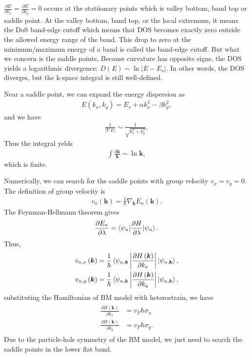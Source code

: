 \documentclass[10pt, oneside]{article}
\newcommand{\p}[1]{\left(#1\right)}
\newcommand{\bv}[1]{\left|#1\right|}
\begin{document}
\(\frac{\partial E}{\partial k_x} = \frac{\partial E}{\partial k_y} = 0\) occurs at the statiionary points which is valley bottom, band top or saddle point. At the valley bottom, band top, or the local extremum, it means the DoS band-edge cutoff which means that DOS becomes exactly zero outside the allowed energy range of the band. This drop to zero at the minimum/maximum energy of a band is called the band-edge cutoff. But what we concern is the saddle points, Because curvature has opposite signs, the DOS  yields a logarithmic divergence: \(D\p{E} \sim \ln \bv{E -E_{s}}\). In other words, the DOS diverges, but the k-space integral is still well-defined.

Near a saddle point, we can expand the energy dispersion as
\begin{align}
	E\p{k_x, k_y} = E_{s} + \alpha k^{2}_{x} - \beta k^{2}_{y},
\end{align}
and we have 
\begin{align}
	\frac{1}{\bv{\nabla E}} \sim \frac{1}{\sqrt{k^{2}_{x} + k^{2}_{y}}},
\end{align}
Thus the integral yelds 
\begin{align}
	\int \frac{d \bm{k}}{\bm{k}} \sim \ln{\bm{k}},
\end{align}
which is finite.

Numerically, we can search for the saddle points with group velocity \(v_x = v_y = 0\). The definition of group velocity is
\begin{align}
	v_{n}\p{\bm{k}} = \frac{1}{\hbar} \nabla_{\bm{k}} E_{n} \p{\bm{k}}.
\end{align}
The Feynman-Hellmann theorem gives
\begin{align}
	\frac{\partial E_{n}}{\partial \lambda} = \braket{\psi_n | \frac{\partial H}{\partial \lambda } | \psi_n}.
\end{align}
Thus, 
\begin{align}
	\begin{split}
		v_{n,x}\p{\bm{k}} & = \frac{1}{\hbar} \braket{\psi_{n, \bm{k}} \bv{\frac{\partial H \p{\bm{k}}}{\partial k_x}} | \psi_{n, \bm{k}}}, \\
		v_{n,y}\p{\bm{k}} & = \frac{1}{\hbar} \braket{\psi_{n, \bm{k}} \bv{\frac{\partial H \p{\bm{k}}}{\partial k_y}} | \psi_{n, \bm{k}}},
	\end{split}
\end{align}
substituting the Hamiltonian of BM model with heterostrain, we have
\begin{align}
	\begin{split}
		\frac{\partial H \p{\bm{k}}}{\partial k_x} & = v_F \hbar \sigma_x \\
		\frac{\partial H \p{\bm{k}}}{\partial k_y} & = v_F \hbar \sigma_y.
	\end{split}
\end{align}
Due to the particle-hole symmetry of the BM model, we just need to search the saddle points in the lower flat band.
\end{document}
